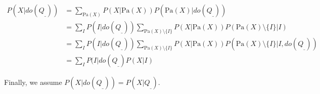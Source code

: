 \begin{align}
    P(X|do(Q_\_))&=\sum_{\text{Pa}(X)} P(X|\text{Pa}(X)) P(\text{Pa}(X)|do(Q_\_)) \\
                 &=\sum_I  P(I|do(Q_\_))\sum_{\text{Pa}(X)\setminus\{I\}} P(X|\text{Pa}(X))P(\text{Pa}(X)\setminus\{I\}|I) \\
                 &=\sum_I  P(I|do(Q_\_))\sum_{\text{Pa}(X)\setminus\{I\}} P(X|\text{Pa}(X))P(\text{Pa}(X)\setminus\{I\}|I, do(Q_\_)) \\
                 &=\sum_I P(I|do(Q_\_) P(X|I)
\end{align}

Finally, we assume $P(X|do(Q_\_))=P(X|Q_\_)$.   